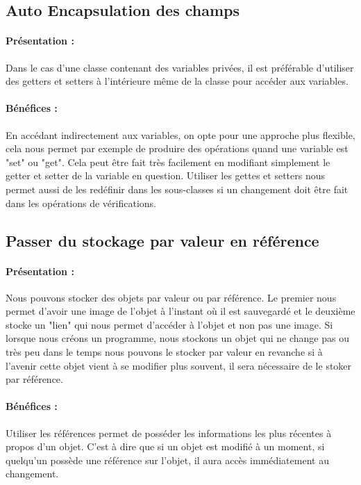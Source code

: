 \documentclass[a4paper,twoside,12pt,openright]{report}
\begin{document}
\subsection{Auto Encapsulation des champs}
\paragraph{Présentation :}
Dans le cas d'une classe contenant des variables privées, il est préférable d'utiliser des getters et setters à l'intérieure même de la classe pour accéder aux variables.

\paragraph{Bénéfices :}
En accédant indirectement aux variables, on opte pour une approche plus flexible, cela nous permet par exemple de produire des opérations quand une variable est "set" ou "get". Cela peut être fait très facilement en modifiant simplement le getter et setter de la variable en question.
Utiliser les gettes et setters nous permet aussi de les redéfinir dans les sous-classes si un changement doit être fait dans les opérations de vérifications.

\subsection{Passer du stockage par valeur en référence}
\paragraph{Présentation :}
Nous pouvons stocker des objets par valeur ou par référence. Le premier nous permet d'avoir une image de l'objet à l'instant où il est sauvegardé et le deuxième stocke un "lien" qui nous permet d'accéder à l'objet et non pas une image.
Si lorsque nous créons un programme, nous stockons un objet qui ne change pas ou très peu dans le temps nous pouvons le stocker par valeur en revanche si à l'avenir cette objet vient à se modifier plus souvent, il sera nécessaire de le stoker par référence.

\paragraph{Bénéfices :}
Utiliser les références permet de posséder les informations les plus récentes à propos d'un objet. C'est à dire que si un objet est modifié à un moment, si quelqu'un possède une référence sur l'objet, il aura accès immédiatement au changement.
\end{document}
